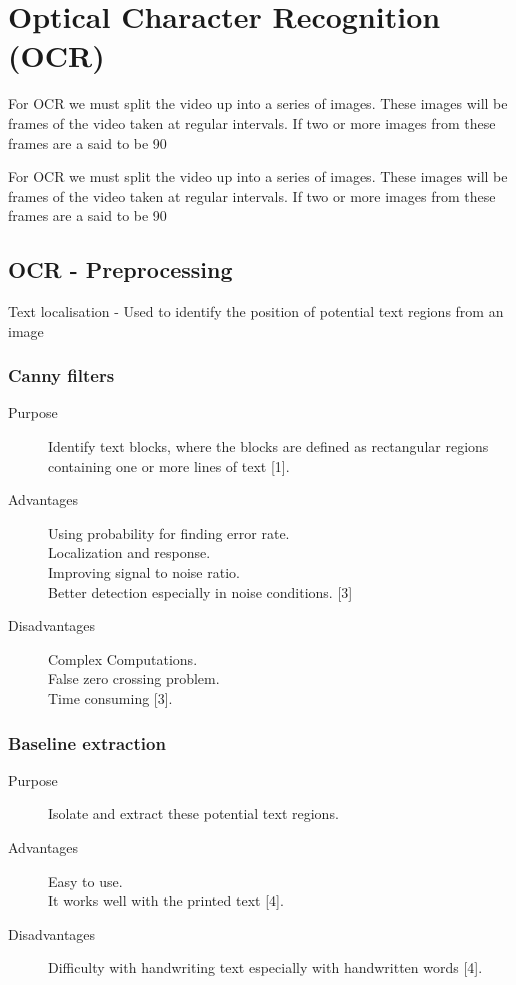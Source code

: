 \documentclass[a4paper,12pt]{article}
\begin{document}
\section{Optical Character Recognition (OCR)}
For OCR we must split the video up into a series of images. These images will be frames of the video taken at regular intervals. If two or more images from these frames are a said to be 90%

For OCR we must split the video up into a series of images. These images will be frames of the video taken at regular intervals. If two or more images from these frames are a said to be 90%

\subsection{OCR - Preprocessing}
Text localisation - Used to identify the position of potential text regions from an image
\subsubsection{Canny filters}
\begin{description}

\item[Purpose] Identify text blocks, where the blocks are defined as rectangular regions containing one or more lines of text [1].
\item[Advantages] Using probability for finding error rate.
\\ Localization and response.
\\ Improving signal to noise ratio.
\\ Better detection especially in noise conditions. [3]
\item[Disadvantages] Complex Computations.
\\ False zero crossing problem.
\\ Time consuming [3].
\end{description}

\subsubsection{Baseline extraction}
\begin{description}
\item[Purpose] Isolate and extract these potential text regions.
\item[Advantages] Easy to use.
\\ It works well with the printed text [4].
\item[Disadvantages] Difficulty with handwriting text especially with handwritten words [4].
\end{description}
\end{document}
